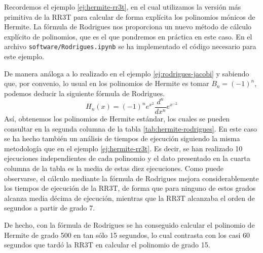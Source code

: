 \begin{ejemplo}
    Recordemos el ejemplo \ref{ej:hermite-rr3t}, en el cual utilizamos la versión más primitiva de la RR3T para calcular de forma explícita los polinomios mónicos de Hermite. La fórmula de Rodrigues nos proporciona un nuevo método de cálculo explícito de polinomios, que es el que pondremos en práctica en este caso. En el archivo \texttt{software/Rodrigues.ipynb} se ha implementado el código necesario para este ejemplo.

    De manera análoga a lo realizado en el ejemplo \ref{ej:rodrigues-jacobi} y sabiendo que, por convenio, lo usual en los polinomios de Hermite es tomar $B_n=(-1)^n$, podemos deducir la siguiente fórmula de Rodrigues. 
    $$
    H_n(x)=(-1)^n e^{x^2}\frac{d^n}{dx^n}e^{x^{-2}}
    $$
    Así, obtenemos los polinomios de Hermite estándar, los cuales se pueden consultar en la segunda columna de la tabla \ref{tab:hermite-rodrigues}. En este caso se ha hecho también un análisis de tiempos de ejecución siguiendo la misma metodología que en el ejemplo \ref{ej:hermite-rr3t}. Es decir, se han realizado 10 ejecuciones independientes de cada polinomio y el dato presentado en la cuarta columna de la tabla es la media de estas diez ejecuciones. Como puede observarse, el cálculo mediante la fórmula de Rodrigues mejora considerablemente los tiempos de ejecución de la RR3T, de forma que para ninguno de estos grados alcanza media décima de ejecución, mientras que la RR3T alcanzaba el orden de segundos a partir de grado 7.

    De hecho, con la fórmula de Rodrigues se ha conseguido calcular el polinomio de Hermite de grado 500 en tan sólo 15 segundos, lo cual contrasta con los casi 60 segundos que tardó la RR3T en calcular el polinomio de grado 15.


\end{ejemplo}
